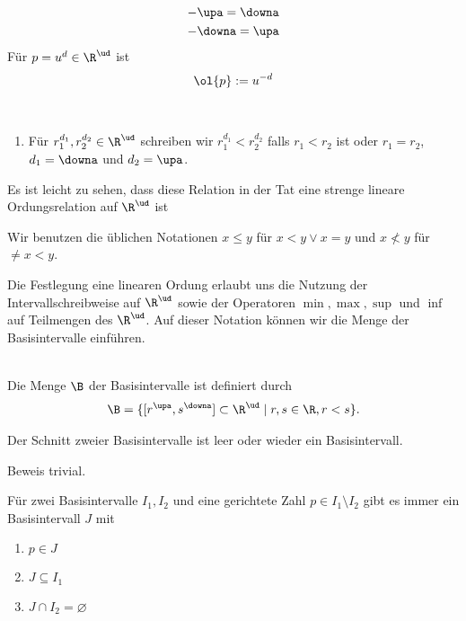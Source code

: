 \begin{nota}
    \begin{align*}
        -\upa = \downa\\
        -\downa = \upa
    \end{align*}
    Für $p = u^d \in \R^\ud$ ist
    \begin{align*}
        \ol{p} := u^{-d}
    \end{align*}
\end{nota}

\begin{dfn}\ \\
    \begin{enumerate}
        \item Für $r_1^{d_1},r_2^{d_2} \in \R^\ud$ schreiben wir $r_1^{d_1} < r_2^{d_2}$ falls $r_1 < r_2$ ist oder $r_1 = r_2$, $d_1 = \downa$ und $d_2 = \upa$.
    \end{enumerate}
\end{dfn}
Es ist leicht zu sehen, dass diese Relation in der Tat eine strenge lineare Ordungsrelation auf $\R^\ud$ ist

Wir benutzen die üblichen Notationen $x \leq y$ für $x < y \lor x = y$ und $x \nless y$ für $\neq x < y$.

Die Festlegung eine linearen Ordung erlaubt uns die Nutzung der Intervallschreibweise auf $\R^\ud$ sowie der Operatoren $\min, \max, \sup$ und $\inf$ auf Teilmengen des $\R^\ud$. 
Auf dieser Notation können wir die Menge der Basisintervalle einführen.

\begin{dfn}[Basisintervalle]\ \\
    Die Menge $\B$ der Basisintervalle ist definiert durch
    \begin{align*}
        \B = \{[r^\upa, s^\downa] \subset \R^\ud \mid r,s \in \R, r<s\}.
    \end{align*}
\end{dfn}

\begin{satz}
    Der Schnitt zweier Basisintervalle ist leer oder wieder ein Basisintervall.
\end{satz}
Beweis trivial.

\begin{satz}\label{satz:strong-sup-1}
    Für zwei Basisintervalle $I_1, I_2$ und eine gerichtete Zahl $p \in I_1 \setminus I_2$ gibt es immer ein Basisintervall $J$ mit
    \begin{enumerate}
        \item $p \in J$
        \item $J \subseteq I_1$
        \item $J \cap I_2 = \varnothing$
    \end{enumerate}
\end{satz}


